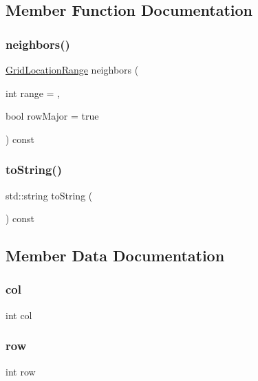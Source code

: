 \subsection{Member Function Documentation}
\mbox{\label{structGridLocation_a094f1ff0e132adda3ebe98103a24f8a4}} 
\subsubsection{\texorpdfstring{neighbors()}{neighbors()}}
{\footnotesize\ttfamily \mbox{\hyperlink{classGridLocationRange}{Grid\+Location\+Range}} neighbors (\begin{DoxyParamCaption}\item[{int}]{range = {},  }\item[{bool}]{row\+Major = {\ttfamily true} }\end{DoxyParamCaption}) const}

\mbox{\label{structGridLocation_a1fe5121d6528fdea3f243321b3fa3a49}} 
\subsubsection{\texorpdfstring{to\+String()}{toString()}}
{\footnotesize\ttfamily std\+::string to\+String (\begin{DoxyParamCaption}{ }\end{DoxyParamCaption}) const}



\subsection{Member Data Documentation}
\mbox{\label{structGridLocation_afb52e720f5f0c483db5861f9e42e924e}} 
\subsubsection{\texorpdfstring{col}{col}}
{\footnotesize\ttfamily int col}

\mbox{\label{structGridLocation_af1d3cff2e4538e23400e260bae3dadad}} 
\subsubsection{\texorpdfstring{row}{row}}
{\footnotesize\ttfamily int row}

